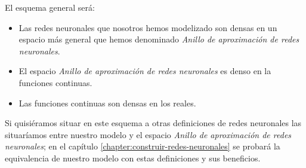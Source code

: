 El esquema general será: 

    \setlength{\marginparwidth}{\bigMarginSize}


\begin{itemize}
    \item Las redes neuronales que nosotros hemos modelizado son densas en un espacio más general que hemos denominado \textit{Anillo de aproximación de redes neuronales}. 
    \item El espacio \textit{Anillo de aproximación de redes neuronales} es denso en la funciones continuas.
    \item Las funciones continuas son densas en los reales. 
\end{itemize}

Si quisiéramos situar en este esquema a otras definiciones de redes neuronales las situaríamos entre  nuestro modelo y el espacio \textit{Anillo de aproximación de redes neuronales}; en  el capítulo \ref{chapter:construir-redes-neuronales} se probará la equivalencia de nuestro modelo con estas definiciones y sus beneficios. 


